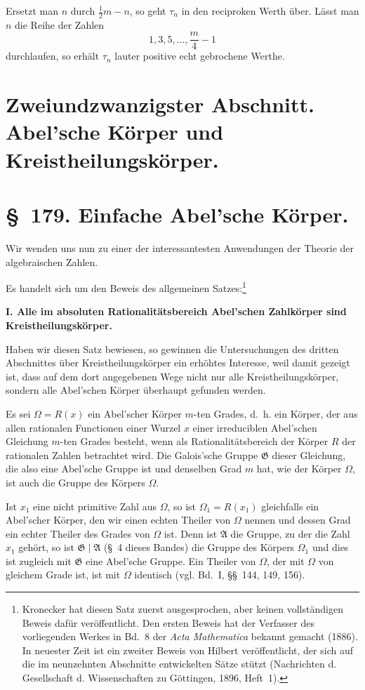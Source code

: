 \documentclass[11pt]{article}
\newcommand{\Om}{\Omega}
\newcommand{\Gg}{\mathfrak G}
\newcommand{\Aa}{\mathfrak A}
\begin{document}
Ersetzt man $n$ durch $\frac12m-n$, so geht $\tau_n$ in den reciproken Werth über. Lässt man $n$ die Reihe der Zahlen
\[
1,3,5,\ldots,\frac m4-1
\]
durchlaufen, so erhält $\tau_n$ lauter positive echt gebrochene Werthe.

\clearpage
\section*{Zweiundzwanzigster Abschnitt. Abel'sche Körper und Kreistheilungskörper.}

\section*{\S~179. Einfache Abel'sche Körper.}

Wir wenden uns nun zu einer der interessantesten Anwendungen der Theorie der algebraischen Zahlen.

Es handelt sich um den Beweis des allgemeinen Satzes:\footnote{Kronecker hat diesen Satz zuerst ausgesprochen, aber keinen vollständigen Beweis dafür veröffentlicht. Den ersten Beweis hat der Verfasser des vorliegenden Werkes in Bd.~8 der \textit{Acta Mathematica} bekannt gemacht (1886). In neuester Zeit ist ein zweiter Beweis von Hilbert veröffentlicht, der sich auf die im neunzehnten Abschnitte entwickelten Sätze stützt (Nachrichten d. Gesellschaft d. Wissenschaften zu Göttingen, 1896, Heft~1).}

\textbf{I. Alle im absoluten Rationalitätsbereich Abel'schen Zahlkörper sind Kreistheilungskörper.}

Haben wir diesen Satz bewiesen, so gewinnen die Untersuchungen des dritten Abschnittes über Kreistheilungskörper ein erhöhtes Interesse, weil damit gezeigt ist, dass auf dem dort angegebenen Wege nicht nur alle Kreistheilungskörper, sondern alle Abel'schen Körper überhaupt gefunden werden.

Es sei $\Om=R(x)$ ein Abel'scher Körper $m$-ten Grades, d.~h. ein Körper, der aus allen rationalen Functionen einer Wurzel $x$ einer irreduciblen Abel'schen Gleichung $m$-ten Grades besteht, wenn als Rationalitätsbereich der Körper $R$ der rationalen Zahlen betrachtet wird. Die Galois'sche Gruppe $\Gg$ dieser Gleichung, die also eine Abel'sche Gruppe ist und denselben Grad $m$ hat, wie der Körper $\Om$, ist auch die Gruppe des Körpers $\Om$.

Ist $x_1$ eine nicht primitive Zahl aus $\Om$, so ist $\Om_1=R(x_1)$ gleichfalls ein Abel'scher Körper, den wir einen echten Theiler von $\Om$ nennen und dessen Grad ein echter Theiler des Grades von $\Om$ ist. Denn ist $\Aa$ die Gruppe, zu der die Zahl $x_1$ gehört, so ist $\Gg\mid\Aa$ (\S~4 dieses Bandes) die Gruppe des Körpers $\Om_1$ und dies ist zugleich mit $\Gg$ eine Abel'sche Gruppe. Ein Theiler von $\Om$, der mit $\Om$ von gleichem Grade ist, ist mit $\Om$ identisch (vgl. Bd.~I, \S\S~144, 149, 156).
\end{document}
